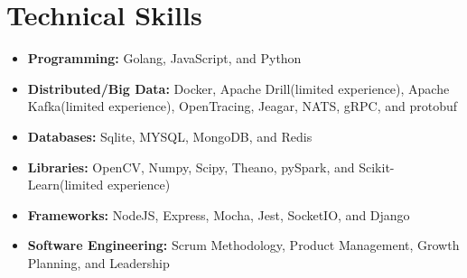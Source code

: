 \documentclass[10pt,a4paper,roman]{moderncv}        %
\begin{document}
\section{Technical Skills}
\begin{itemize} \itemsep \shortSpace
\item \textbf{Programming:} Golang, JavaScript, and Python

\item \textbf{Distributed/Big Data:} Docker, Apache Drill(limited experience), Apache Kafka(limited experience), OpenTracing, Jeagar, NATS, gRPC, and protobuf

\item \textbf{Databases:} Sqlite, MYSQL, MongoDB, and Redis

\item \textbf{Libraries:} OpenCV, Numpy, Scipy, Theano, pySpark, and Scikit-Learn(limited experience)

\item \textbf{Frameworks:} NodeJS, Express, Mocha, Jest, SocketIO, and Django

\item \textbf{Software Engineering:} Scrum Methodology, Product Management, Growth Planning, and Leadership

\end{itemize}
\end{document}
